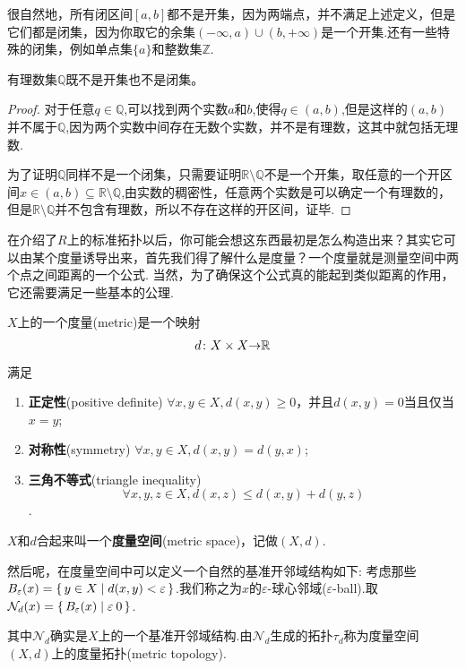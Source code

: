 很自然地，所有闭区间$[a,b]$都不是开集，因为两端点，并不满足上述定义，但是它们都是闭集，因为你取它的余集$(-\infty,a) \cup (b,+\infty)$是一个开集.还有一些特殊的闭集，例如单点集$\{a\}$和整数集$\mathbb{Z}$.

\begin{proposition}
有理数集$\mathbb{Q}$既不是开集也不是闭集。
\end{proposition}

\begin{proof}
对于任意$q \in \mathbb{Q}$,可以找到两个实数$a$和$b$,使得$q \in (a,b)$,但是这样的$(a,b)$并不属于$\mathbb{Q}$,因为两个实数中间存在无数个实数，并不是有理数，这其中就包括无理数.

为了证明$\mathbb{Q}$同样不是一个闭集，只需要证明$\mathbb{R} \setminus \mathbb{Q}$不是一个开集，取任意的一个开区间$x \in (a,b) \subseteq \mathbb{R} \setminus \mathbb{Q}$,由实数的稠密性，任意两个实数是可以确定一个有理数的，但是$\mathbb{R} \setminus \mathbb{Q}$并不包含有理数，所以不存在这样的开区间，证毕.
\end{proof}

在介绍了$R$上的标准拓扑以后，你可能会想这东西最初是怎么构造出来？其实它可以由某个度量诱导出来，首先我们得了解什么是度量？一个度量就是测量空间中两个点之间距离的一个公式. 当然，为了确保这个公式真的能起到类似距离的作用，它还需要满足一些基本的公理.

\begin{definition}
$X$上的一个度量(metric)是一个映射\[{d}\colon{X \times X}{\to}{\mathbb{R}}\]满足
\begin{enumerate}
	\item \textbf{正定性}(positive definite) $\forall x,y \in X,d(x,y) \geq 0$，并且$d(x,y)=0$当且仅当$x=y$;
	\item \textbf{对称性}(symmetry) $\forall x,y \in X,d(x,y)=d(y,x)$;
	\item \textbf{三角不等式}(triangle inequality) \[\forall x,y,z \in X,d(x,z) \leq d(x,y)+d(y,z)\].
\end{enumerate}
$X$和$d$合起来叫一个\textbf{度量空间}(metric space)，记做$(X,d)$.
\end{definition}

然后呢，在度量空间中可以定义一个自然的基准开邻域结构如下: 考虑那些$B_{\varepsilon}(x)=\{\,y \in X\mid d(x,y) < \varepsilon\,\}$.我们称之为$x$的$\varepsilon$-球心邻域($\varepsilon$-ball).取$\mathcal{N}_d(x)=\{\,B_{\varepsilon}(x)\mid\varepsilon \> 0\,\}$.

\begin{proposition}
其中$\mathcal{N}_d$确实是$X$上的一个基准开邻域结构.由$\mathcal{N}_d$生成的拓扑$\tau_d$称为度量空间$(X,d)$上的度量拓扑(metric topology).
\end{proposition}

